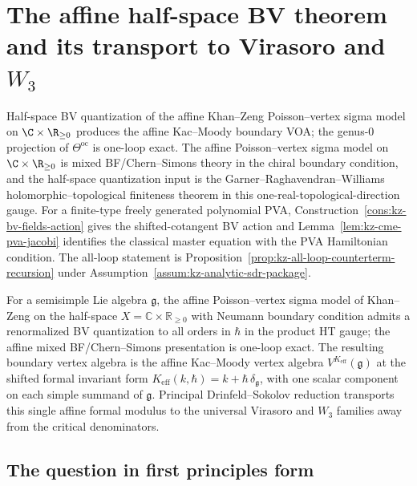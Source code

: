 
\chapter{The affine half-space BV theorem and its transport to Virasoro and \texorpdfstring{$W_3$}{W3}}
\label{chap:affine-half-space-bv}

\begin{remark}
Half-space BV quantization of the affine Khan--Zeng Poisson--vertex sigma model on $\C \times \R_{\ge 0}$ produces the affine Kac--Moody boundary VOA; the genus-$0$ projection of $\Theta^{\mathrm{oc}}$ is one-loop exact. The affine Poisson--vertex sigma model on $\C \times \R_{\ge 0}$ is mixed BF/Chern--Simons theory in the chiral boundary condition, and the half-space quantization input is the Garner--Raghavendran--Williams holomorphic--topological finiteness theorem in this one-real-topological-direction gauge. For a finite-type freely generated polynomial PVA, Construction~\ref{cons:kz-bv-fields-action} gives the shifted-cotangent BV action and Lemma~\ref{lem:kz-cme-pva-jacobi} identifies the classical master equation with the PVA Hamiltonian condition. The all-loop statement is Proposition~\ref{prop:kz-all-loop-counterterm-recursion} under Assumption~\ref{assum:kz-analytic-sdr-package}.
\end{remark}

For a semisimple Lie algebra $\mathfrak g$, the affine Poisson--vertex sigma model of
Khan--Zeng on the half-space $X = \mathbb C \times \mathbb R_{\ge 0}$ with Neumann boundary
condition admits a renormalized BV quantization to all orders in $\hbar$ in the product HT gauge; the affine
mixed BF/Chern--Simons presentation is one-loop exact. The resulting boundary vertex algebra is the affine
Kac--Moody vertex algebra $V^{K_{\mathrm{eff}}}(\mathfrak g)$ at the shifted formal invariant form
$K_{\mathrm{eff}}(k,\hbar)=k+\hbar\,\delta_{\mathfrak g}$, with one scalar component on each simple summand
of $\mathfrak g$. Principal Drinfeld--Sokolov reduction transports this single affine formal modulus to the
universal Virasoro and $W_3$ families away from the critical denominators.

\section{The question in first principles form}

